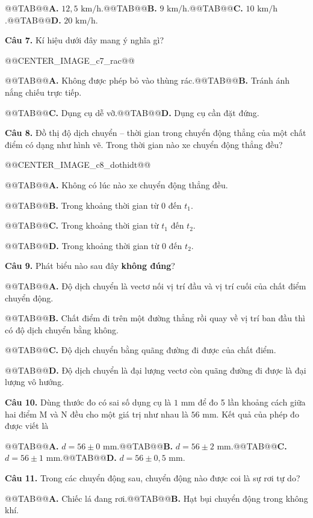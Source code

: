 \documentclass[11pt,a4paper]{article}
\begin{document}
@@TAB@@\textbf{A.} $12{,}5\text{ km/h}$.@@TAB@@\textbf{B.} $9\text{ km/h}$.@@TAB@@\textbf{C.} $10\text{ km/h}$.@@TAB@@\textbf{D.} $20\text{ km/h}$.

\textbf{Câu 7.} Kí hiệu dưới đây mang ý nghĩa gì?

@@CENTER_IMAGE_c7_rac@@

@@TAB@@\textbf{A.} Không được phép bỏ vào thùng rác.@@TAB@@\textbf{B.} Tránh ánh nắng chiếu trực tiếp.

@@TAB@@\textbf{C.} Dụng cụ dễ vỡ.@@TAB@@\textbf{D.} Dụng cụ cần đặt đứng.

\textbf{Câu 8.} Đồ thị độ dịch chuyển -- thời gian trong chuyển động thẳng của một chất điểm có dạng như hình vẽ. Trong thời gian nào xe chuyển động thẳng đều?

@@CENTER_IMAGE_c8_dothidt@@

@@TAB@@\textbf{A.} Không có lúc nào xe chuyển động thẳng đều.

@@TAB@@\textbf{B.} Trong khoảng thời gian từ $0$ đến $t_1$.

@@TAB@@\textbf{C.} Trong khoảng thời gian từ $t_1$ đến $t_2$.

@@TAB@@\textbf{D.} Trong khoảng thời gian từ $0$ đến $t_2$.

\textbf{Câu 9.} Phát biểu nào sau đây \textbf{không đúng}?

@@TAB@@\textbf{A.} Độ dịch chuyển là vectơ nối vị trí đầu và vị trí cuối của chất điểm chuyển động.

@@TAB@@\textbf{B.} Chất điểm đi trên một đường thẳng rồi quay về vị trí ban đầu thì có độ dịch chuyển bằng không.

@@TAB@@\textbf{C.} Độ dịch chuyển bằng quãng đường đi được của chất điểm.

@@TAB@@\textbf{D.} Độ dịch chuyển là đại lượng vectơ còn quãng đường đi được là đại lượng vô hướng.

\textbf{Câu 10.} Dùng thước đo có sai số dụng cụ là $1\text{ mm}$ để đo 5 lần khoảng cách giữa hai điểm M và N đều cho một giá trị như nhau là $56\text{ mm}$. Kết quả của phép đo được viết là

@@TAB@@\textbf{A.} $d = 56 \pm 0\text{ mm}$.@@TAB@@\textbf{B.} $d = 56 \pm 2\text{ mm}$.@@TAB@@\textbf{C.} $d = 56 \pm 1\text{ mm}$.@@TAB@@\textbf{D.} $d = 56 \pm 0{,}5\text{ mm}$.

\textbf{Câu 11.} Trong các chuyển động sau, chuyển động nào được coi là sự rơi tự do?

@@TAB@@\textbf{A.} Chiếc lá đang rơi.@@TAB@@\textbf{B.} Hạt bụi chuyển động trong không khí.
\end{document}
